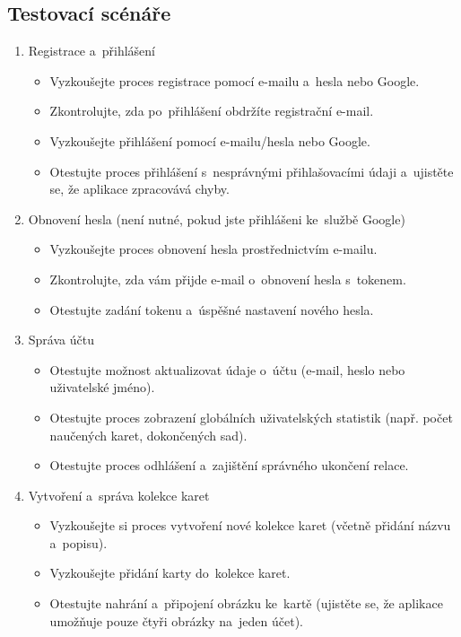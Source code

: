 \documentclass[twoside]{ctuthesis}
\begin{document}
\subsection{Testovací scénáře}

\begin{enumerate}
\item Registrace a~přihlášení
\begin{itemize}[label=\textbullet]
\item Vyzkoušejte proces registrace pomocí e-mailu a~hesla nebo Google.
\item Zkontrolujte, zda po~přihlášení obdržíte registrační e-mail.
\item Vyzkoušejte přihlášení pomocí e-mailu/hesla nebo Google.
\item Otestujte proces přihlášení s~nesprávnými přihlašovacími údaji a~ujistěte se, že aplikace zpracovává chyby.
\end{itemize}
\item Obnovení hesla (není nutné, pokud jste přihlášeni ke~službě Google)
\begin{itemize}[label=\textbullet]
\item Vyzkoušejte proces obnovení hesla prostřednictvím e-mailu.
\item Zkontrolujte, zda vám přijde e-mail o~obnovení hesla s~tokenem.
\item Otestujte zadání tokenu a~úspěšné nastavení nového hesla.
\end{itemize}
\item Správa účtu
\begin{itemize}[label=\textbullet]
\item Otestujte možnost aktualizovat údaje o~účtu (e-mail, heslo nebo uživatelské jméno).
\item Otestujte proces zobrazení globálních uživatelských statistik (např. počet naučených karet, dokončených sad).
\item Otestujte proces odhlášení a~zajištění správného ukončení relace.
\end{itemize}
\item Vytvoření a~správa kolekce karet
\begin{itemize}[label=\textbullet]
\item Vyzkoušejte si proces vytvoření nové kolekce karet (včetně přidání názvu a~popisu).
\item Vyzkoušejte přidání karty do~kolekce karet.
\item Otestujte nahrání a~připojení obrázku ke~kartě (ujistěte se, že aplikace umožňuje pouze čtyři obrázky na~jeden účet).

\end{itemize}
\end{enumerate}
\end{document}
